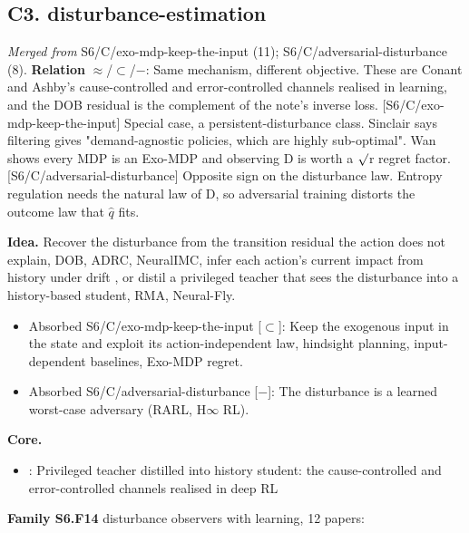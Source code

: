 \documentclass[10pt]{article}
\newcommand{\memb}[1]{\par\smallskip\textbf{#1}\quad}
\begin{document}
\subsection{C3. disturbance-estimation}\label{node:S6-S6-C-disturbance-estimation}
\textit{Merged from} S6/C/exo-mdp-keep-the-input (11); S6/C/adversarial-disturbance (8). \textbf{Relation} $\approx$/$\subset$/$-$: Same mechanism, different objective. These are Conant and Ashby's cause-controlled and error-controlled channels realised in learning, and the DOB residual is the complement of the note's inverse loss. [S6/C/exo-mdp-keep-the-input] Special case, a persistent-disturbance class. Sinclair says filtering gives "demand-agnostic policies, which are highly sub-optimal". Wan shows every MDP is an Exo-MDP and observing D is worth a \ensuremath{\surd}r regret factor. [S6/C/adversarial-disturbance] Opposite sign on the disturbance law. Entropy regulation needs the natural law of D, so adversarial training distorts the outcome law that \ensuremath{\hat{q}} fits.

\textbf{Idea.} Recover the disturbance from the transition residual the action does not explain, DOB, ADRC, NeuralIMC, infer each action's current impact from history under drift \citep{Zeng-moving23}, or distil a privileged teacher that sees the disturbance into a history-based student, RMA, Neural-Fly.
\begin{itemize}[nosep,leftmargin=1.2em]
\item Absorbed S6/C/exo-mdp-keep-the-input [\ensuremath{\subset}]: Keep the exogenous input in the state and exploit its action-independent law, hindsight planning, input-dependent baselines, Exo-MDP regret.
\item Absorbed S6/C/adversarial-disturbance [\ensuremath{-}]: The disturbance is a learned worst-case adversary (RARL, H\ensuremath{\infty} RL).
\end{itemize}


\memb{Core.}
\begin{itemize}[nosep,leftmargin=1.2em]
\item \citet{Kumar-rma21}: Privileged teacher distilled into history student: the cause-controlled and error-controlled channels realised in deep RL
\end{itemize}
\memb{Family S6.F14} disturbance observers with learning, 12 papers: {\footnotesize \citetext{\citealp{Wang-dobnet19}; \citealp{Akella-learning22}; \citealp{Gao-neural24}; \citealp{Han-pid09}; \citealp{Chen-disturbanceobserverbased16}; \citealp{Chen-neural22}; \citealp{Cheng-safe22}; \citealp{Vu-disturbance22}; \citealp{Jia-learningbased24}; \citealp{Kalaria-disturbance24}; \citealp{Kim-stabilityaware26}; \citealp{Yang-caro26}}}
\end{document}
